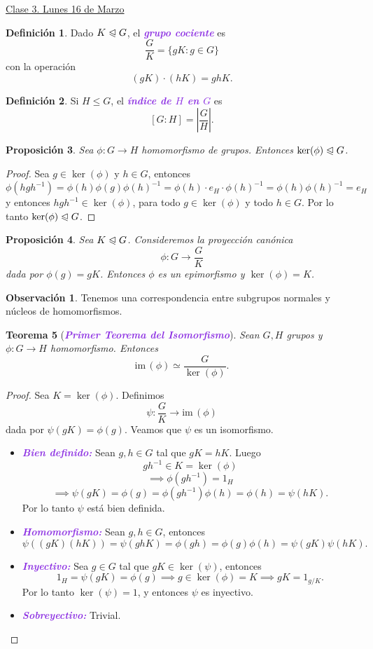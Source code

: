 \documentclass{article}
\newtheorem{theorem}{Teorema}[subsection]
\newtheorem{proposition}[theorem]{Proposición}
\theoremstyle{definition}
\newtheorem{definition}[theorem]{Definición}
\newtheorem*{obs}{Observación}
\theoremstyle{remark}
\numberwithin{equation}{section}
\renewcommand{\c}{\cdot}
\newcommand{\normal}{\trianglelefteqslant}
\newcommand{\im}{\mathrm{im}\,}
\newcommand{\abs}[1]{\left| #1 \right|}
\newcommand{\wea}[1]{\textcolor{BlueViolet}{\textbf{\emph{#1}}}}
\newcommand{\fecha}[1]{\begin{flushright} \underline{#1} \end{flushright}}
\begin{document}
\fecha{Clase 3. Lunes 16 de Marzo}

\begin{definition}
  Dado $K \normal G$, el \wea{grupo cociente} es
  \[\frac{G}{K} = \{gK \colon g \in G\}\]
  con la operación
  \[(gK) \c (hK) = ghK.\]
\end{definition}

\begin{definition}
  Si $H \leqslant G$, el \wea{índice de $H$ en $G$} es $$[G \colon H] = \abs{\frac{G}{H}}.$$
\end{definition}

\begin{proposition}
  Sea $\phi \colon G \to H$ homomorfismo de grupos. Entonces $\ker(\phi) \normal G$.
\end{proposition}
\begin{proof}
  Sea $g \in \ker(\phi)$ y $h \in G$, entonces
  \[\phi(hgh^{-1}) = \phi(h) \phi(g) \phi(h)^{-1} = \phi(h) \c e_H \c \phi(h)^{-1} = \phi(h) \phi(h)^{-1} = e_H\]
  y entonces $hgh^{-1} \in \ker(\phi)$, para todo $g \in \ker(\phi)$ y todo $h \in G$. Por lo tanto $\ker(\phi) \normal G$.
\end{proof}

\begin{proposition}
  Sea $K \normal G$. Consideremos la proyección canónica $$\phi \colon G \to \frac GK$$ dada por $\phi(g) = gK$. Entonces $\phi$ es un epimorfismo y $\ker(\phi) = K$.
\end{proposition}

\begin{obs}
  Tenemos una correspondencia entre subgrupos normales y núcleos de homomorfismos. %
\end{obs}

\begin{theorem}[\wea{Primer Teorema del Isomorfismo}]
  Sean $G,H$ grupos y $\phi \colon G \to H$ homomorfismo. Entonces
  \[\im(\phi) \simeq \frac{G}{\ker(\phi)}.\]
\end{theorem}
\begin{proof}
  Sea $K = \ker(\phi)$. Definimos $$\psi \colon \frac G K \to \im(\phi)$$ dada por $\psi(gK) = \phi(g)$. Veamos que $\psi$ es un isomorfismo.
  \begin{itemize}
    \item \wea{Bien definido:} Sean $g,h \in G$ tal que $gK = hK$. Luego
    $$gh^{-1} \in K = \ker(\phi)$$
    $$\implies \phi(gh^{-1}) = 1_H$$
    $$\implies \psi(gK) = \phi(g) = \phi(gh^{-1}) \phi(h) = \phi(h) = \psi(hK).$$
    Por lo tanto $\psi$ está bien definida.
    \item \wea{Homomorfismo:} Sean $g,h \in G$, entonces
    \[\psi((gK)(hK)) = \psi(ghK) = \phi(gh) = \phi(g) \phi(h) = \psi(gK) \psi(hK).\]
    \item \wea{Inyectivo:} Sea $g \in G$ tal que $gK \in \ker(\psi)$, entonces
    \[1_H = \psi(gK) = \phi(g) \implies g \in \ker(\phi) = K \implies gK = 1_{g/K}.\]
    Por lo tanto $\ker(\psi) = 1$, y entonces $\psi$ es inyectivo.
    \item \wea{Sobreyectivo:} Trivial. %
  \end{itemize}
\end{proof}
\end{document}
